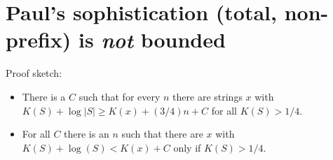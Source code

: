 \documentclass{style/llncs}
\begin{document}
\section{Paul's sophistication (total, non-prefix) is \emph{not}  bounded}

Proof sketch:

\begin{itemize}
  \item There is a $C$ such that for every $n$ there are strings $x$
    with $K(S)+\log|S|\ge K(x)+(3/4)n+C$ for all $K(S)>1/4$.

  \item For all $C$ there is an $n$ such that there are $x$ with
    $K(S)+\log(S)<K(x)+C$ only if $K(S)>1/4$.
\end{itemize}



\end{document}
